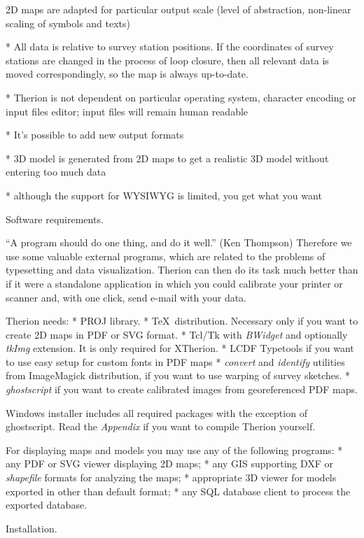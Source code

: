   2D maps are adapted for particular output scale (level of abstraction,
  non-linear scaling of symbols and texts)

* All data is relative to survey station positions. If the coordinates
  of survey stations are changed in the process of loop closure, then all relevant
  data is moved correspondingly, so the map is always up-to-date.

* Therion is not dependent on particular operating system, character encoding
  or input files editor; input files will remain human readable

* It's possible to add new output formats

* 3D model is generated from 2D maps to get a realistic 3D model
  without entering too much data

* although the support for WYSIWYG is limited, you get what you want
\endlist

\subchapter Software requirements.

``A program should do one thing, and do it well.'' (Ken Thompson)
Therefore we use some valuable external programs, which are related to the
problems of typesetting and data visualization. Therion can then do its task
much better than if it were a standalone application in which you could calibrate
your printer or scanner and, with one click, send e-mail with your data.

Therion needs:
\list
* PROJ library.
* \TeX\ distribution.
  Necessary only if you want to create 2D maps in PDF or SVG format.
* Tcl/Tk with {\it BWidget} and optionally {\it tkImg}
  extension. It is only required for XTherion.
* LCDF Typetools if you want to use easy setup for custom fonts in PDF maps
* {\it convert} and {\it identify} utilities from ImageMagick distribution,
  if you want to use warping of survey sketches.
* {\it ghostscript} if you want to create calibrated images from georeferenced
  PDF maps.
\endlist

Windows installer includes all required packages with the exception of {ghostscript}.
Read the {\it Appendix} if you want to compile Therion yourself.

For displaying maps and models you may use any of the following programs:
\list
* any PDF or SVG viewer displaying 2D maps;
* any GIS supporting DXF or {\it shapefile} formats for analyzing the maps;
* appropriate 3D viewer for models exported in other than default format;
* any SQL database client to process the exported database.
\endlist


\subchapter Installation.

